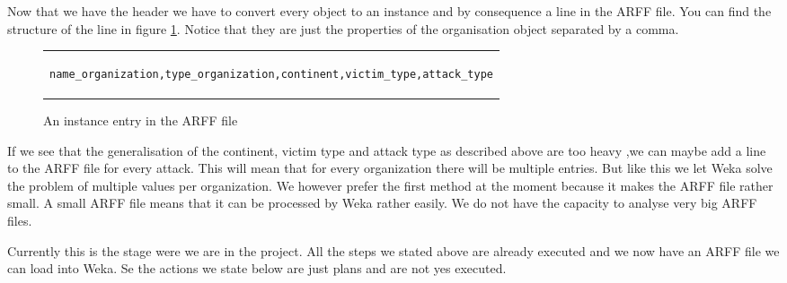 \documentclass[a4]{article}
\begin{document}
Now that we have the header we have to convert every object to an instance and by consequence a line in the ARFF file. You can find the structure of the line in figure \ref{fig:entry}. Notice that they are just the properties of the organisation object separated by a comma.\par
\begin{figure}[!ht]
\centering
\begin{tabular}{c}
\begin{lstlisting}
name_organization,type_organization,continent,victim_type,attack_type
\end{lstlisting}
\end{tabular}
\caption{An instance entry in the ARFF file}
\label{fig:entry}
\end{figure}
If we see that the generalisation of the continent, victim type and attack type as described above are too heavy ,we can maybe add a line to the ARFF file for every attack. This will mean that for every organization there will be multiple entries. But like this we let Weka solve the problem of multiple values per organization. We however prefer the first method at the moment because it makes the ARFF file rather small. A small ARFF file means that it can be processed by Weka rather easily. We do not have the capacity to analyse very big ARFF files.\par
Currently this is the stage were we are in the project. All the steps we stated above are already executed and we now have an ARFF file we can load into Weka. Se the actions we state below are just plans and are not yes executed.
\end{document}
